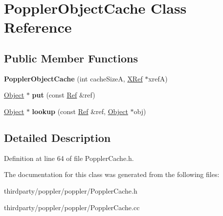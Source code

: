 \hypertarget{class_poppler_object_cache}{}\section{Poppler\+Object\+Cache Class Reference}
\label{class_poppler_object_cache}
\subsection*{Public Member Functions}
\begin{DoxyCompactItemize}
\item 
\mbox{\label{class_poppler_object_cache_a48aa518015ecfe3bdead2b9e14bb12c8}} 
{\bfseries Poppler\+Object\+Cache} (int cache\+SizeA, \hyperlink{class_x_ref}{X\+Ref} $\ast$xrefA)
\item 
\mbox{\label{class_poppler_object_cache_a66a972dc00ad0b2fde727a8775a59d92}} 
\hyperlink{class_object}{Object} $\ast$ {\bfseries put} (const \hyperlink{struct_ref}{Ref} \&ref)
\item 
\mbox{\label{class_poppler_object_cache_a648d54890fddd7ae0b60335cb78ece99}} 
\hyperlink{class_object}{Object} $\ast$ {\bfseries lookup} (const \hyperlink{struct_ref}{Ref} \&ref, \hyperlink{class_object}{Object} $\ast$obj)
\end{DoxyCompactItemize}


\subsection{Detailed Description}


Definition at line 64 of file Poppler\+Cache.\+h.



The documentation for this class was generated from the following files\+:\begin{DoxyCompactItemize}
\item 
thirdparty/poppler/poppler/Poppler\+Cache.\+h\item 
thirdparty/poppler/poppler/Poppler\+Cache.\+cc\end{DoxyCompactItemize}
